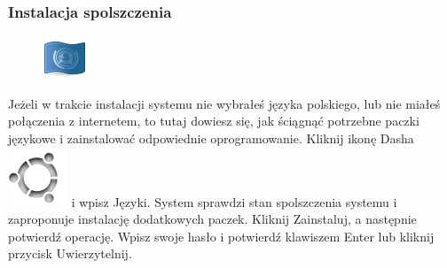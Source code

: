 \subsubsection{Instalacja spolszczenia}
\begin{figure}
	\vspace{-10pt}
	\includegraphics[width=\linewidth]{images/pierwsze_uruchomienie_lang1.png}
\end{figure}

Jeżeli w trakcie instalacji systemu nie wybrałeś języka polskiego, lub nie miałeś połączenia z internetem, to tutaj dowiesz się, jak ściągnąć potrzebne paczki językowe i zainstalować odpowiednie oprogramowanie.
Kliknij ikonę Dasha \includegraphics[scale=0.35]{images/ikony_dash.png} i wpisz \textcolor{ubuntu_orange}{Języki}. System sprawdzi stan spolszczenia systemu i zaproponuje instalację dodatkowych paczek. Kliknij \textcolor{ubuntu_orange}{Zainstaluj}, a następnie potwierdź operację. Wpisz swoje hasło i potwierdź klawiszem Enter lub kliknij przycisk \textcolor{ubuntu_orange}{Uwierzytelnij}.

